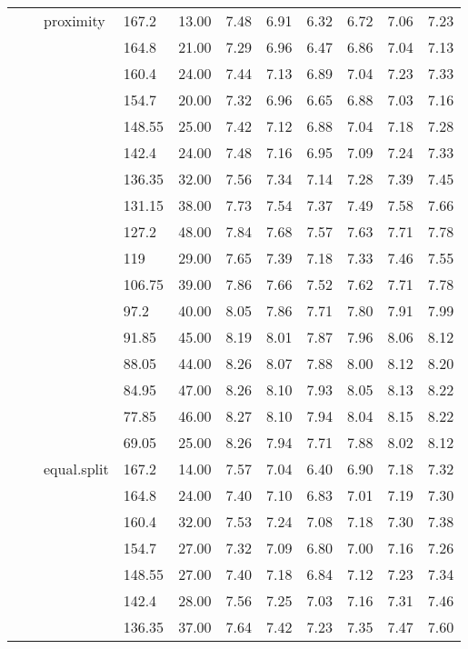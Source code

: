 \begin{longtable}{llllrrrrrrr}
   &  & proximity & 167.2 & 13.00 & 7.48 & 6.91 & 6.32 & 6.72 & 7.06 & 7.23 \\ 
   &  &  & 164.8 & 21.00 & 7.29 & 6.96 & 6.47 & 6.86 & 7.04 & 7.13 \\ 
   &  &  & 160.4 & 24.00 & 7.44 & 7.13 & 6.89 & 7.04 & 7.23 & 7.33 \\ 
   &  &  & 154.7 & 20.00 & 7.32 & 6.96 & 6.65 & 6.88 & 7.03 & 7.16 \\ 
   &  &  & 148.55 & 25.00 & 7.42 & 7.12 & 6.88 & 7.04 & 7.18 & 7.28 \\ 
   &  &  & 142.4 & 24.00 & 7.48 & 7.16 & 6.95 & 7.09 & 7.24 & 7.33 \\ 
   &  &  & 136.35 & 32.00 & 7.56 & 7.34 & 7.14 & 7.28 & 7.39 & 7.45 \\ 
   &  &  & 131.15 & 38.00 & 7.73 & 7.54 & 7.37 & 7.49 & 7.58 & 7.66 \\ 
   &  &  & 127.2 & 48.00 & 7.84 & 7.68 & 7.57 & 7.63 & 7.71 & 7.78 \\ 
   &  &  & 119 & 29.00 & 7.65 & 7.39 & 7.18 & 7.33 & 7.46 & 7.55 \\ 
   &  &  & 106.75 & 39.00 & 7.86 & 7.66 & 7.52 & 7.62 & 7.71 & 7.78 \\ 
   &  &  & 97.2 & 40.00 & 8.05 & 7.86 & 7.71 & 7.80 & 7.91 & 7.99 \\ 
   &  &  & 91.85 & 45.00 & 8.19 & 8.01 & 7.87 & 7.96 & 8.06 & 8.12 \\ 
   &  &  & 88.05 & 44.00 & 8.26 & 8.07 & 7.88 & 8.00 & 8.12 & 8.20 \\ 
   &  &  & 84.95 & 47.00 & 8.26 & 8.10 & 7.93 & 8.05 & 8.13 & 8.22 \\ 
   &  &  & 77.85 & 46.00 & 8.27 & 8.10 & 7.94 & 8.04 & 8.15 & 8.22 \\ 
   &  &  & 69.05 & 25.00 & 8.26 & 7.94 & 7.71 & 7.88 & 8.02 & 8.12 \\ 
   &  & equal.split & 167.2 & 14.00 & 7.57 & 7.04 & 6.40 & 6.90 & 7.18 & 7.32 \\ 
   &  &  & 164.8 & 24.00 & 7.40 & 7.10 & 6.83 & 7.01 & 7.19 & 7.30 \\ 
   &  &  & 160.4 & 32.00 & 7.53 & 7.24 & 7.08 & 7.18 & 7.30 & 7.38 \\ 
   &  &  & 154.7 & 27.00 & 7.32 & 7.09 & 6.80 & 7.00 & 7.16 & 7.26 \\ 
   &  &  & 148.55 & 27.00 & 7.40 & 7.18 & 6.84 & 7.12 & 7.23 & 7.34 \\ 
   &  &  & 142.4 & 28.00 & 7.56 & 7.25 & 7.03 & 7.16 & 7.31 & 7.46 \\ 
   &  &  & 136.35 & 37.00 & 7.64 & 7.42 & 7.23 & 7.35 & 7.47 & 7.60 \\ 

\end{longtable}
